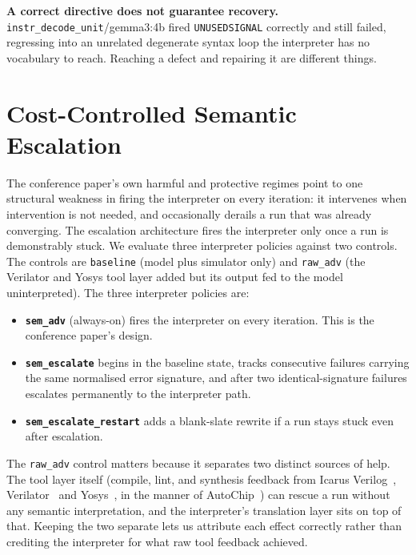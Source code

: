 \documentclass[11pt]{article}
\begin{document}
\textbf{A correct directive does not guarantee recovery.}
\texttt{instr\_decode\_unit}/gemma3:4b fired \texttt{UNUSEDSIGNAL} correctly
and still failed, regressing into an unrelated degenerate syntax loop the
interpreter has no vocabulary to reach. Reaching a defect and repairing it
are different things.

\section{Cost-Controlled Semantic Escalation}
\label{sec:escalate}

The conference paper's own harmful and protective regimes point to one
structural weakness in firing the interpreter on every iteration: it
intervenes when intervention is not needed, and occasionally derails a run
that was already converging. The escalation architecture fires the
interpreter only once a run is demonstrably stuck. We evaluate three
interpreter policies against two controls. The controls are \texttt{baseline}
(model plus simulator only) and \texttt{raw\_adv} (the Verilator and Yosys
tool layer added but its output fed to the model uninterpreted). The three
interpreter policies are:

\begin{itemize}[leftmargin=1.2em, itemsep=0.15em]
\item \textbf{\texttt{sem\_adv}} (always-on) fires the interpreter on every
iteration. This is the conference paper's design.
\item \textbf{\texttt{sem\_escalate}} begins in the baseline state, tracks
consecutive failures carrying the same normalised error signature, and after
two identical-signature failures escalates permanently to the interpreter
path.
\item \textbf{\texttt{sem\_escalate\_restart}} adds a blank-slate rewrite if a
run stays stuck even after escalation.
\end{itemize}

The \texttt{raw\_adv} control matters because it separates two distinct
sources of help. The tool layer itself (compile, lint, and synthesis feedback
from Icarus Verilog~\cite{iverilog}, Verilator~\cite{verilator} and
Yosys~\cite{yosys}, in the manner of AutoChip~\cite{autochip}) can rescue a
run without any semantic interpretation, and the interpreter's translation
layer sits on top of that. Keeping the two separate lets us attribute each
effect correctly rather than crediting the interpreter for what raw tool
feedback achieved.
\end{document}
